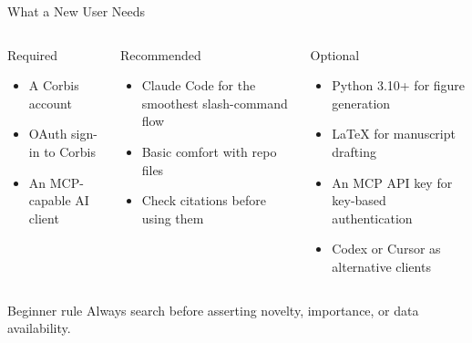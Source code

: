 \documentclass[aspectratio=169,professionalfonts]{beamer}
\begin{document}
\begin{frame}[t]{What a New User Needs}
\footnotesize
\begin{columns}[T,onlytextwidth]
\begin{block}{Required}
\begin{itemize}
  \item A Corbis account
  \item OAuth sign-in to Corbis
  \item An MCP-capable AI client
\end{itemize}
\end{block}
\begin{block}{Recommended}
\begin{itemize}
  \item Claude Code for the smoothest slash-command flow
  \item Basic comfort with repo files
  \item Check citations before using them
\end{itemize}
\end{block}
\begin{block}{Optional}
\begin{itemize}
  \item Python 3.10+ for figure generation
  \item LaTeX for manuscript drafting
  \item An MCP API key for key-based authentication
  \item Codex or Cursor as alternative clients
\end{itemize}
\end{block}
\end{columns}
\vspace{0.6em}
\begin{alertblock}{Beginner rule}
Always search before asserting novelty, importance, or data availability.
\end{alertblock}
\end{frame}
\end{document}
